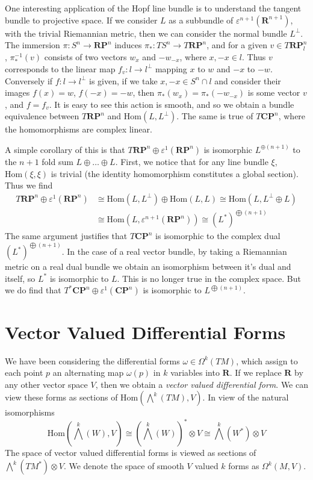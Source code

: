 One interesting application of the Hopf line bundle is to understand the tangent bundle to projective space. If we consider $L$ as a subbundle of $\varepsilon^{n+1}(\mathbf{R}^{n+1})$, with the trivial Riemannian metric, then we can consider the normal bundle $L^\perp$. The immersion $\pi: S^n \to \mathbf{RP}^n$ induces $\pi_*: TS^n \to T\mathbf{RP}^n$, and for a given $v \in T\mathbf{RP}^n_l$, $\pi_*^{-1}(v)$ consists of two vectors $w_x$ and $-w_{-x}$, where $x,-x \in l$. Thus $v$ corresponds to the linear map $f_v: l \to l^\perp$ mapping $x$ to $w$ and $-x$ to $-w$. Conversely if $f: l \to l^\perp$ is given, if we take $x,-x \in S^n \cap l$ and consider their images $f(x) = w$, $f(-x) = -w$, then $\pi_*(w_x) = \pi_*(-w_{-x})$ is some vector $v$, and $f = f_v$. It is easy to see this action is smooth, and so we obtain a bundle equivalence between $T\mathbf{RP}^n$ and $\text{Hom}(L,L^\perp)$. The same is true of $T\mathbf{CP}^n$, where the homomorphisms are complex linear.

A simple corollary of this is that $T\mathbf{RP}^n \oplus \varepsilon^1(\mathbf{RP}^n)$ is isomorphic $L^{\oplus (n+1)}$ to the $n+1$ fold sum $L \oplus \dots \oplus L$. First, we notice that for any line bundle $\xi$, $\text{Hom}(\xi,\xi)$ is trivial (the identity homomorphism constitutes a global section). Thus we find
%
\begin{align*}
    T\mathbf{RP}^n \oplus \varepsilon^1(\mathbf{RP}^n) &\cong \text{Hom}(L,L^\perp) \oplus \text{Hom}(L,L) \cong \text{Hom}(L,L^\perp \oplus L)\\
    &\cong \text{Hom}(L,\varepsilon^{n+1}(\mathbf{RP}^n)) \cong (L^*)^{\bigoplus (n+1)}
\end{align*}
%
The same argument justifies that $T\mathbf{CP}^n$ is isomorphic to the complex dual $(L^*)^{\bigoplus (n+1)}$. In the case of a real vector bundle, by taking a Riemannian metric on a real dual bundle we obtain an isomorphism between it's dual and itself, so $L^*$ is isomorphic to $L$. This is no longer true in the complex space. But we do find that $T^* \mathbf{CP}^n \oplus \varepsilon^1(\mathbf{CP}^n)$ is isomorphic to $L^{\bigoplus (n+1)}$.

\section{Vector Valued Differential Forms}

We have been considering the differential forms $\omega \in \Omega^k(TM)$, which assign to each point $p$ an alternating map $\omega(p)$ in $k$ variables into $\mathbf{R}$. If we replace $\mathbf{R}$ by any other vector space $V$, then we obtain a \emph{vector valued differential form}. We can view these forms as sections of $\text{Hom} \left( \bigwedge^k(TM) ,V \right)$. In view of the natural isomorphisms
%
\[ \text{Hom} \left( \bigwedge^k(W) ,V \right) \cong (\bigwedge^k(W))^* \otimes V \cong \bigwedge^k(W^*) \otimes V \]
%
The space of vector valued differential forms is viewed as sections of $\bigwedge^k(TM^*) \otimes V$. We denote the space of smooth $V$ valued $k$ forms as $\Omega^k(M,V)$.

